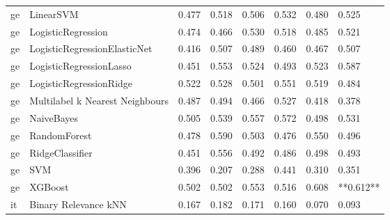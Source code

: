\begin{tabular}{llllllll}
      ge &                       LinearSVM & 0.477 &                     0.518 &                 0.506 &                  0.532 &                                   0.480 &     0.525 \\
      ge &              LogisticRegression & 0.474 &                     0.466 &                 0.530 &                  0.518 &                                   0.485 &     0.521 \\
      ge &    LogisticRegressionElasticNet & 0.416 &                     0.507 &                 0.489 &                  0.460 &                                   0.467 &     0.507 \\
      ge &         LogisticRegressionLasso & 0.451 &                     0.553 &                 0.524 &                  0.493 &                                   0.523 &     0.587 \\
      ge &         LogisticRegressionRidge & 0.522 &                     0.528 &                 0.501 &                  0.551 &                                   0.519 &     0.484 \\
      ge & Multilabel k Nearest Neighbours & 0.487 &                     0.494 &                 0.466 &                  0.527 &                                   0.418 &     0.378 \\
      ge &                      NaiveBayes & 0.505 &                     0.539 &                 0.557 &                  0.572 &                                   0.498 &     0.531 \\
      ge &                    RandomForest & 0.478 &                     0.590 &                 0.503 &                  0.476 &                                   0.550 &     0.496 \\
      ge &                 RidgeClassifier & 0.451 &                     0.556 &                 0.492 &                  0.486 &                                   0.498 &     0.493 \\
      ge &                             SVM & 0.396 &                     0.207 &                 0.288 &                  0.441 &                                   0.310 &     0.351 \\
      ge &                         XGBoost & 0.502 &                     0.502 &                 0.553 &                  0.516 &                                   0.608 & **0.612** \\
      it &            Binary Relevance kNN & 0.167 &                     0.182 &                 0.171 &                  0.160 &                                   0.070 &     0.093 \\

\end{tabular}
